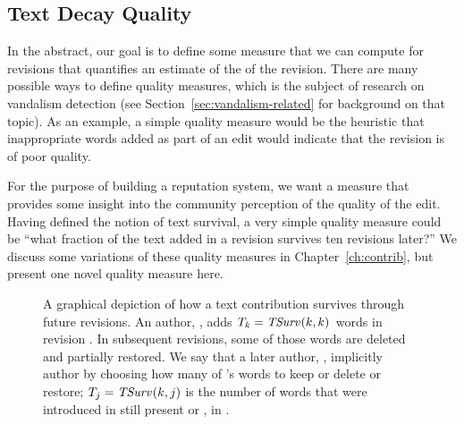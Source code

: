 \subsection{Text Decay Quality}

In the abstract, our goal is to define some measure that we can compute for
revisions that quantifies an estimate of the  of the
revision.
There are many possible ways to define quality measures, which is the
subject of research on vandalism detection (see
Section~\ref{sec:vandalism-related} for background on that topic).
As an example, a simple quality measure would be the heuristic that
inappropriate words added as part of an edit would indicate that the revision
is of poor quality.

For the purpose of building a reputation system, we want a measure
that provides some insight into the community perception of the
quality of the edit.
Having defined the notion of text survival, a very simple quality measure
could be ``what fraction of the text added in a revision survives
ten revisions later?''
We discuss some variations of these quality measures in
Chapter~\ref{ch:contrib}, but present one novel quality measure here.

\begin{figure}[htbp]
\centering
{}
\caption[Depiction of how a text contribution survives through future
        revisions]{A graphical depiction of how a text contribution survives
	through future revisions.
        An author, , adds
    $T_k = \mathit{TSurv}_{}(k,k)$ words in revision .  In subsequent
    revisions, some of those words are deleted and partially restored.
    We say that a later author, , implicitly 
    author  by choosing how many of 's words
    to keep or delete or restore; $T_j = \mathit{TSurv}_{}(k,j)$ is the number of words
    that were introduced in  still present or
    , in .
}
\label{fig:textsurvival}
\end{figure}



